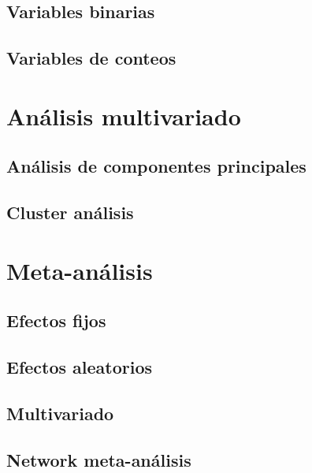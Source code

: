 \documentclass[]{book}
\begin{document}
\hypertarget{variables-binarias}{%
\section{Variables binarias}\label{variables-binarias}}

\hypertarget{variables-de-conteos}{%
\section{Variables de conteos}\label{variables-de-conteos}}

\hypertarget{multivar}{%
\chapter{Análisis multivariado}\label{multivar}}

\hypertarget{analisis-de-componentes-principales}{%
\section{Análisis de componentes
principales}\label{analisis-de-componentes-principales}}

\hypertarget{cluster-analisis}{%
\section{Cluster análisis}\label{cluster-analisis}}

\hypertarget{meta}{%
\chapter{Meta-análisis}\label{meta}}

\hypertarget{efectos-fijos}{%
\section{Efectos fijos}\label{efectos-fijos}}

\hypertarget{efectos-aleatorios}{%
\section{Efectos aleatorios}\label{efectos-aleatorios}}

\hypertarget{multivariado}{%
\section{Multivariado}\label{multivariado}}

\hypertarget{network-meta-analisis}{%
\section{Network meta-análisis}\label{network-meta-analisis}}
\end{document}
